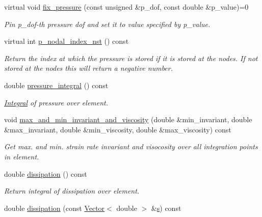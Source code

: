 \begin{DoxyCompactItemize}
virtual void \hyperlink{classoomph_1_1GeneralisedNewtonianNavierStokesEquations_a1a39938f37a0a61229e273ea541d5437}{fix\+\_\+pressure} (const unsigned \&p\+\_\+dof, const double \&p\+\_\+value)=0
\begin{DoxyCompactList}\small\item\em Pin p\+\_\+dof-\/th pressure dof and set it to value specified by p\+\_\+value. \end{DoxyCompactList}\item 
virtual int \hyperlink{classoomph_1_1GeneralisedNewtonianNavierStokesEquations_aae2c43cb69c84108e838b5aec8bd2a4b}{p\+\_\+nodal\+\_\+index\+\_\+nst} () const
\begin{DoxyCompactList}\small\item\em Return the index at which the pressure is stored if it is stored at the nodes. If not stored at the nodes this will return a negative number. \end{DoxyCompactList}\item 
double \hyperlink{classoomph_1_1GeneralisedNewtonianNavierStokesEquations_a3240c1554d001b3bff60c1cc90d74836}{pressure\+\_\+integral} () const
\begin{DoxyCompactList}\small\item\em \hyperlink{classoomph_1_1Integral}{Integral} of pressure over element. \end{DoxyCompactList}\item 
void \hyperlink{classoomph_1_1GeneralisedNewtonianNavierStokesEquations_a21c779dd47121dafefa537004f508d76}{max\+\_\+and\+\_\+min\+\_\+invariant\+\_\+and\+\_\+viscosity} (double \&min\+\_\+invariant, double \&max\+\_\+invariant, double \&min\+\_\+viscosity, double \&max\+\_\+viscosity) const
\begin{DoxyCompactList}\small\item\em Get max. and min. strain rate invariant and visocosity over all integration points in element. \end{DoxyCompactList}\item 
double \hyperlink{classoomph_1_1GeneralisedNewtonianNavierStokesEquations_a4f4ce2b0fb2e736e76a08188f3f0f7e3}{dissipation} () const
\begin{DoxyCompactList}\small\item\em Return integral of dissipation over element. \end{DoxyCompactList}\item 
double \hyperlink{classoomph_1_1GeneralisedNewtonianNavierStokesEquations_acdce90ef405748bc9d17677e1f98b85c}{dissipation} (const \hyperlink{classoomph_1_1Vector}{Vector}$<$ double $>$ \&\hyperlink{cfortran_8h_ab7123126e4885ef647dd9c6e3807a21c}{s}) const

\end{DoxyCompactItemize}
